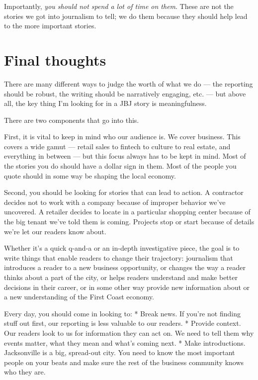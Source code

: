 \documentclass[
  12pt,
  american,
  letterpaperpaper,
  extrafontsizes,onecolumn,openright
  ]{memoir}
\begin{document}
Importantly, \emph{you should not spend a lot of time on them}. These are not the stories we got into journalism to tell; we do them because they should help lead to the more important stories.

\hypertarget{final-thoughts}{%
\section*{Final thoughts}\label{final-thoughts}}

There are many different ways to judge the worth of what we do --- the reporting should be robust, the writing should be narratively engaging, etc.
--- but above all, the key thing I'm looking for in a JBJ story is meaningfulness.

There are two components that go into this.

First, it is vital to keep in mind who our audience is. We cover business. This covers a wide gamut --- retail sales to fintech to culture to real estate, and everything in between --- but this focus always has to be kept in mind. Most of the stories you do should have a dollar sign in them. Most of the people you quote should in some way be shaping the local economy.

Second, you should be looking for stories that can lead to action. A contractor decides not to work with a company because of improper behavior we've uncovered. A retailer decides to locate in a particular shopping center because of the big tenant we've told them is coming. Projects stop or start because of details we're let our readers know about.

Whether it's a quick q-and-a or an in-depth investigative piece, the goal is to write things that enable readers to change their trajectory: journalism that introduces a reader to a new business opportunity, or changes the way a reader thinks about a part of the city, or helps readers understand and make better decisions in their career, or in some other way provide new information about or a new understanding of the First Coast economy.

Every day, you should come in looking to:
* Break news. If you're not finding stuff out first, our reporting is less valuable to our readers.
* Provide context. Our readers look to us for information they can act on. We need to tell them why events matter, what they mean and what's coming next.
* Make introductions. Jacksonville is a big, spread-out city. You need to know the most important people on your beats and make sure the rest of the business community knows who they are.
\end{document}

